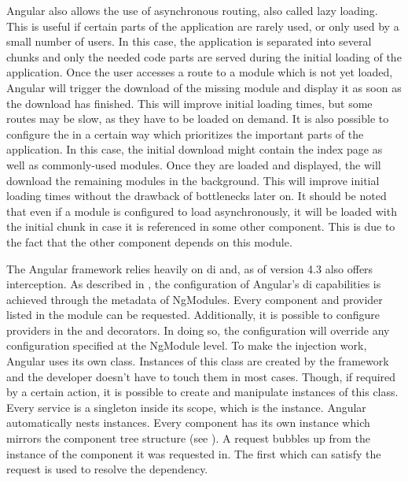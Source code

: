 Angular also allows the use of asynchronous routing, also called lazy loading. This is useful if certain parts of the application are rarely used, or only used by a small number of users. In this case, the application is separated into several chunks and only the needed code parts are served during the initial loading of the application. Once the user accesses a route to a module which is not yet loaded, Angular will trigger the download of the missing module and display it as soon as the download has finished. This will improve initial loading times, but some routes may be slow, as they have to be loaded on demand. It is also possible to configure the  in a certain way which prioritizes the important parts of the application. In this case, the initial download might contain the index page as well as commonly-used modules. Once they are loaded and displayed, the  will download the remaining modules in the background. This will improve initial loading times without the drawback of bottlenecks later on. It should be noted that even if a module is configured to load asynchronously, it will be loaded with the initial chunk in case it is referenced in some other component. This is due to the fact that the other component depends on this module.



The Angular framework relies heavily on \gls{di} and, as of version 4.3 \cite{interceptorAngularVersion} also offers interception. As described in , the configuration of Angular's \gls{di} capabilities is achieved through the metadata of NgModules. Every component and provider listed in the module can be requested. Additionally, it is possible to configure providers in the  and  decorators. In doing so, the configuration will override any configuration specified at the NgModule level. To make the injection work, Angular uses its own  class. Instances of this class are created by the framework and the developer doesn't have to touch them in most cases. Though, if required by a certain action, it is possible to create and manipulate instances of this class. Every service is a singleton inside its scope, which is the  instance. Angular automatically nests  instances. Every component has its own  instance which mirrors the component tree structure (see ). A request bubbles up from the  instance of the component it was requested in. The first  which can satisfy the request is used to resolve the dependency.


